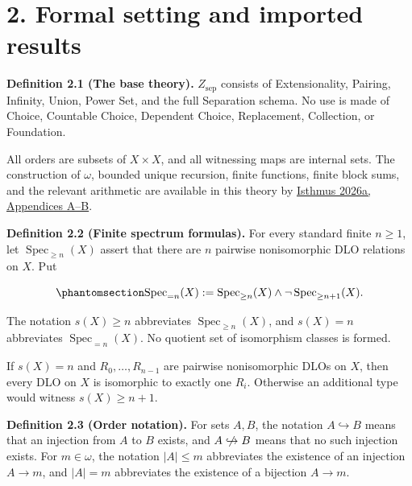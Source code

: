 \documentclass[
  english,
  11pt,
  reqno]{amsart}
\providecommand{\nhookrightarrow}{\centernot\hookrightarrow}
\begin{document}
\protect{}\label{sec:formal-setting}

\section{2. Formal setting and imported
results}\label{formal-setting-and-imported-results}

\protect{}\label{def:2-1-base-theory}

\textbf{Definition 2.1 (The base theory).} \(Z_{\mathrm{sep}}\) consists
of Extensionality, Pairing, Infinity, Union, Power Set, and the full
Separation schema. No use is made of Choice, Countable Choice, Dependent
Choice, Replacement, Collection, or Foundation.

All orders are subsets of \(X\times X\), and all witnessing maps are
internal sets. The construction of \(\omega\), bounded unique recursion,
finite functions, finite block sums, and the relevant arithmetic are
available in this theory by \hyperref[ref:isthmus2026a]{Isthmus 2026a,
Appendices A--B}.

\protect{}\label{def:2-2-spectrum}

\textbf{Definition 2.2 (Finite spectrum formulas).} For every standard
finite \(n\ge1\), let \(\operatorname{Spec}_{\ge n}(X)\) assert that
there are \(n\) pairwise nonisomorphic DLO relations on \(X\). Put

\begin{equation}\protect\phantomsection\label{eq:finite-spectrum-formula}{
\operatorname{Spec}_{=n}(X)
:=
\operatorname{Spec}_{\ge n}(X)
\wedge
\neg\operatorname{Spec}_{\ge n+1}(X).
}\end{equation}

The notation \(s(X)\ge n\) abbreviates
\(\operatorname{Spec}_{\ge n}(X)\), and \(s(X)=n\) abbreviates
\(\operatorname{Spec}_{=n}(X)\). No quotient set of isomorphism classes
is formed.

If \(s(X)=n\) and \(R_0,\ldots,R_{n-1}\) are pairwise nonisomorphic DLOs
on \(X\), then every DLO on \(X\) is isomorphic to exactly one \(R_i\).
Otherwise an additional type would witness \(s(X)\ge n+1\).

\protect{}\label{def:2-3-order-notation}

\textbf{Definition 2.3 (Order notation).} For sets \(A,B\), the notation
\(A\hookrightarrow B\) means that an injection from \(A\) to \(B\)
exists, and \(A\nhookrightarrow B\) means that no such injection exists.
For \(m\in\omega\), the notation \(|A|\le m\) abbreviates the existence
of an injection \(A\to m\), and \(|A|=m\) abbreviates the existence of a
bijection \(A\to m\).
\end{document}
